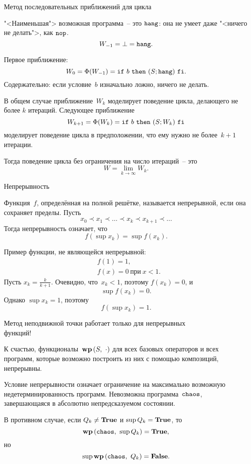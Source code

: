 \documentclass[landscape]{slides}
\begin{document}
\begin{slide}
        Метод последовательных приближений для цикла

        "<Наименьшая"> возможная программа~-- это $\mathtt{hang}$: она не умеет даже "<ничего не делать">, как $\mathtt{nop}$.
        \[
                W_{-1} = \bot = \mathtt{hang} .
        \]

        Первое приближение:
        \[
                W_0 = \Phi(W_{-1}) = \mathtt{if}\ {b}\ \mathtt{then}\ {(S ; \mathtt{hang})}\ \mathtt{fi} .
        \]
        Содержательно: если условие~$b$ изначально ложно, ничего не делать.

        В общем случае приближение~$W_k$ моделирует поведение цикла, делающего не более $k$ итераций. Следующее приближение
        \[
                W_{k+1} = \Phi(W_k) = \mathtt{if}\ {b}\ \mathtt{then}\ {(S ; W_k)}\ \mathtt{fi}
        \]
        моделирует поведение цикла в предположении, что ему нужно не более~$k+1$ итерации.

        Тогда поведение цикла без ограничения на число итераций~-- это
        \[
                W = \lim_{k \to \infty} W_k .
        \]
\end{slide}

\begin{slide}
        Непрерывность

        Функция~$f$, определённая на полной решётке, называется непрерывной, если она сохраняет пределы.
        Пусть
        \[
                x_0\prec x_1\prec\ldots\prec x_k\prec x_{k+1}\prec\ldots
        \]
        Тогда непрерывность означает, что
        \[
                f\left(\sup{x_k}\right) = \sup f\left(x_k\right) .
        \]

        Пример функции, не являющейся непрерывной:
        \begin{eqnarray*}
                &f(1) = 1 ,\\
                &f(x) = 0\ \text{при}\ x<1.
        \end{eqnarray*}
        Пусть $x_k = \frac{k}{k+1}$. Очевидно, что~$x_k < 1$, поэтому $f(x_k) = 0$, и
        \[
                \sup f(x_k) = 0 .
        \]
        Однако $\sup x_k = 1$, поэтому
        \[
                f(\sup x_k) = 1 .
        \]
\end{slide}

\begin{slide}
        Метод неподвижной точки работает только для непрерывных\\функций!

        К счастью, функционалы~$\mathbf{wp}\left({S},\ {\cdot}\right)$ для всех базовых операторов и всех программ,
        которые возможно построить из них с помощью композиций, непрерывны.

        Условие непрерывности означает ограничение на максимально возможную недетерминированность
        программ. Невозможна программа~$\mathtt{chaos}$, завершающаяся в абсолютно непредсказуемом состоянии.

        В противном случае, если $Q_k\ne\mathbf{True}$ и $\sup Q_k = \mathbf{True}$, то
        \[
                \mathbf{wp}\left({\mathtt{chaos}},\ {\sup Q_k}\right) = \mathbf{True},
        \]
        но
        \[
                \sup \mathbf{wp}\left({\mathtt{chaos}},\ {Q_k}\right) = \mathbf{False}.
        \]
\end{slide}
\end{document}
